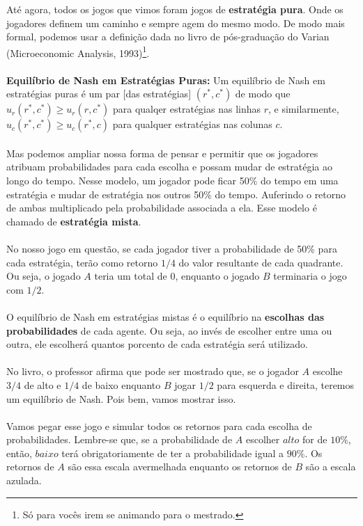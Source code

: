 \documentclass[a4paper,11pt,oneside]{book}
\theoremstyle{definition}
\theoremstyle{break}
\begin{document}
Até agora, todos os jogos que vimos foram jogos de \textbf{estratégia pura}. Onde os jogadores definem um caminho e sempre agem do mesmo modo. De modo mais formal, podemos usar a definição dada no livro de pós-graduação do Varian (Microeconomic Analysis, 1993)\footnote{Só para vocês irem se animando para o mestrado.}.
\\
\\
\textbf{Equilíbrio de Nash em Estratégias Puras:} Um equilíbrio de Nash em estratégias puras é um par [das estratégias] $(r^*,c^*)$ de modo que $u_r(r^*,c^*) \geq u_r(r,c^*)$ para qualqer estratégias nas linhas $r$, e similarmente, $u_c(r^*,c^*) \geq u_c(r^*,c)$ para qualquer estratégias nas colunas $c$.
\\
\\
Mas podemos ampliar nossa forma de pensar e permitir que os jogadores atribuam probabilidades para cada escolha e possam mudar de estratégia ao longo do tempo. Nesse modelo, um jogador pode ficar 50\% do tempo em uma estratégia e mudar de estratégia nos outros 50\% do tempo. Auferindo o retorno de ambas multiplicado pela probabilidade associada a ela. Esse modelo é chamado de \textbf{estratégia mista}.
\\
\\
No nosso jogo em questão, se cada jogador tiver a probabilidade de 50\% para cada estratégia, terão como retorno $1/4$ do valor resultante de cada quadrante. Ou seja, o jogado $A$ teria um total de $0$, enquanto o jogado $B$ terminaria o jogo com $1/2$.
\\
\\
O equilíbrio de Nash em estratégias mistas é o equilíbrio na \textbf{escolhas das probabilidades} de cada agente. Ou seja, ao invés de escolher entre uma ou outra, ele escolherá quantos porcento de cada estratégia será utilizado. 
\\
\\
No livro, o professor afirma que pode ser mostrado que, se o jogador $A$ escolhe $3/4$ de alto e $1/4$ de baixo enquanto $B$ jogar $1/2$ para esquerda e direita, teremos um equilíbrio de Nash. Pois bem, vamos mostrar isso.
\\
\\
Vamos pegar esse jogo e simular todos os retornos para cada escolha de probabilidades. Lembre-se que, se a probabilidade de $A$ escolher $alto$ for de $10\%$, então, $baixo$ terá obrigatoriamente de ter a probabilidade igual a $90\%$. Os retornos de $A$ são essa escala avermelhada enquanto os retornos de $B$ são a escala azulada.
\end{document}
